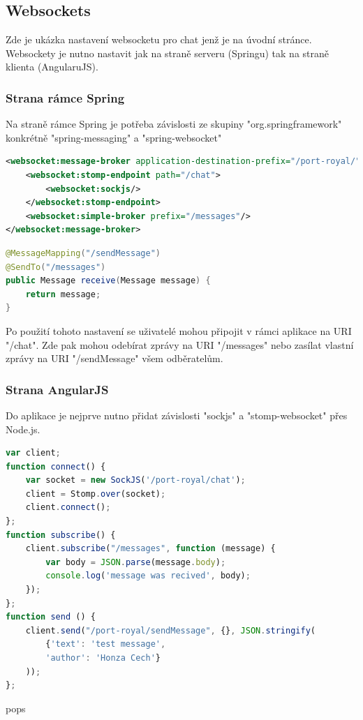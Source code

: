 \documentclass[czech,master,public,dept460,male,cpdeclaration,twoside]{diploma}
\begin{document}
\subsection{Websockets}
Zde je ukázka nastavení websocketu pro chat jenž je na úvodní stránce. Websockety je nutno nastavit jak na straně serveru (Springu) tak na straně klienta (AngularuJS). 

\subsubsection{Strana rámce Spring}
Na straně rámce Spring je potřeba závislosti ze skupiny "org.springframework" konkrétně "spring-messaging" a "spring-websocket"

\begin{lstlisting}[language=XML, caption=XML konfigurace websocketu]
<websocket:message-broker application-destination-prefix="/port-royal/">
    <websocket:stomp-endpoint path="/chat">
        <websocket:sockjs/>
    </websocket:stomp-endpoint>
    <websocket:simple-broker prefix="/messages"/>
</websocket:message-broker>
\end{lstlisting}

\begin{lstlisting}[language=Java, caption=Implementace websocketu v javě]
@MessageMapping("/sendMessage")
@SendTo("/messages")
public Message receive(Message message) {
    return message;
}
\end{lstlisting}

Po použití tohoto nastavení se uživatelé mohou připojit v rámci aplikace na URI "/chat". Zde pak mohou odebírat zprávy na URI "/messages"  nebo zasílat vlastní zprávy na URI "/sendMessage" všem odběratelům.

\subsubsection{Strana AngularJS}
Do aplikace je nejprve nutno přidat závislosti "sockjs" a  "stomp-websocket" přes Node.js.

\begin{lstlisting}[language=JavaScript, caption=Použití websocketu na straně klienta]
var client;      
function connect() {
    var socket = new SockJS('/port-royal/chat');
    client = Stomp.over(socket);
    client.connect();
};
function subscribe() {
    client.subscribe("/messages", function (message) {
        var body = JSON.parse(message.body);
        console.log('message was recived', body);
    });
};
function send () {
    client.send("/port-royal/sendMessage", {}, JSON.stringify(
        {'text': 'test message',
        'author': 'Honza Cech'}
    ));
};
\end{lstlisting}
pops
\end{document}
